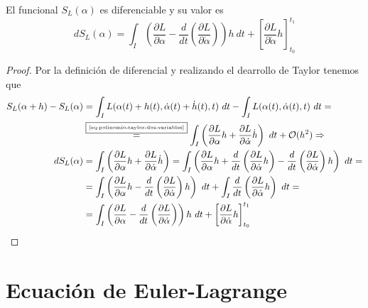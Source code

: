 \begin{theorem}
    El funcional $S_L(\alpha)$ es diferenciable y su valor es
    \begin{equation}
        \label{eq:accion_diferencial}
        dS_L(\alpha)=\int_{I}\left( \frac{\partial L}{\partial \alpha}-\frac{d}{dt}\left( \frac{\partial L}{\partial \dot{\alpha}} \right)\right)h\ dt + \left[ \frac{\partial L}{\partial \dot{\alpha}}h \right]_{t_0}^{t_1}
    \end{equation}
\end{theorem}
\begin{proof}
    Por la definición de diferencial y realizando el dearrollo de Taylor tenemos que
    \begin{equation*}
        \begin{align}
            S_L(\alpha + h) -  S_L(\alpha)& = \int_{I}L(\alpha(t)+h(t), \dot{\alpha}(t)+\dot{h}(t), t)\ dt - \int_{I}L(\alpha(t), \dot{\alpha}(t), t)\ dt =\\
            &\overset{\fbox{\tiny \ref{eq:polinomio-taylor-dos-variables}}}{=}\int_{I}\left( \frac{\partial L}{\partial\alpha}h+\frac{\partial L}{\partial\dot{\alpha}}\dot{h}\right)\ dt+\mathcal{O}(h^2)\Rightarrow\\
            dS_L(\alpha)& =\int_{I}\left( \frac{\partial L}{\partial\alpha}h+\frac{\partial L}{\partial\dot{\alpha}}\dot{h}\right) = \int_{I}\left( \frac{\partial L}{\partial\alpha}h+\frac{d}{dt}\left( \frac{\partial L}{\partial \dot{\alpha}}h \right)-\frac{d}{dt}\left( \frac{\partial L}{\partial \dot{\alpha}} \right)h\right)\ dt = \\
            & = \int_{I}\left( \frac{\partial L}{\partial \alpha}h-\frac{d}{dt}\left( \frac{\partial L}{\partial \dot{\alpha}} \right)h\right)\ dt +\int_{I}\frac{d}{dt}\left( \frac{\partial L}{\partial \dot{\alpha}}h \right)\ dt = \\
            & = \int_{I}\left( \frac{\partial L}{\partial \alpha}-\frac{d}{dt}\left( \frac{\partial L}{\partial \dot{\alpha}} \right)\right)h\ dt + \left[ \frac{\partial L}{\partial \dot{\alpha}}h \right]_{t_0}^{t_1}
        \end{align}
    \end{equation*}
\end{proof}

\section{Ecuación de Euler-Lagrange}

